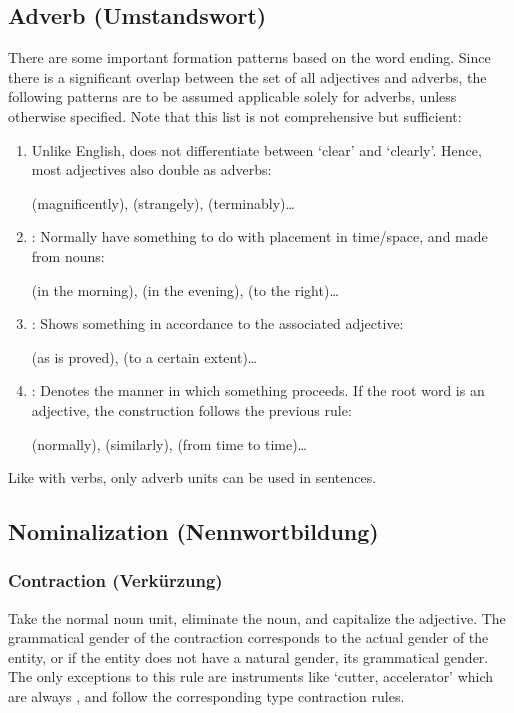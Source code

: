 \subsection[Adverb]{Adverb (Umstandswort)}
There are some important formation patterns based on the word ending. Since there is a significant overlap between the set of all adjectives and adverbs,  the following patterns are to be assumed applicable solely for adverbs, unless otherwise specified. Note that this list is not comprehensive but  sufficient:
\begin{enumerate}
    \item Unlike English,  does not differentiate between `clear' and `clearly'. Hence, most adjectives also double as adverbs: 
    \begin{example}
     (magnificently),  (strangely),  (terminably)\ldots
    \end{example}
    \item {}: Normally have something to do with placement in time/space, and made from nouns: 
    \begin{example}
     (in the morning),  (in the evening),  (to the right)\ldots
    \end{example}
    \item {}: Shows  something  in accordance to the associated adjective: 
    \begin{example}
     (as is proved),  (to a certain extent)\ldots
    \end{example}
    \item {}: Denotes the manner in which  something proceeds. If the root word is an adjective, the construction follows the previous rule: 
    \begin{example}
     (normally),  (similarly),  (from time to time)\ldots
    \end{example}
\end{enumerate}
Like with verbs, only  adverb units can be used in sentences. 

\subsection[Nominalization]{Nominalization (Nennwortbildung)}
\subsubsection{Contraction (Verkürzung)}
Take the normal noun unit, eliminate the noun, and  capitalize the adjective. The grammatical gender of the contraction corresponds to the actual gender of the entity, or if the entity does not have a natural gender, its grammatical gender. The only exceptions to this rule are instruments like `cutter, accelerator' which are always , and follow the corresponding  type contraction rules.


